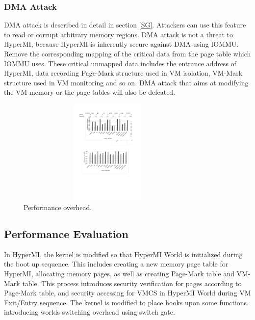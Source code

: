 \documentclass[conference]{IEEEtran}
\begin{document}
\subsubsection{DMA Attack}

 DMA attack is described in detail in section \ref{SG}. Attackers can use this feature to read or corrupt arbitrary memory regions. DMA attack is not a threat to HyperMI, because HyperMI is inherently secure against DMA using IOMMU. Remove the corresponding mapping of the critical data from the page table which IOMMU uses. These critical unmapped data includes the entrance address of HyperMI, data recording Page-Mark structure used in VM isolation, VM-Mark structure used in VM monitoring and so on. DMA attack that aims at modifying the VM memory or the page tables will also be defeated.

\begin{figure}
\centerline{\includegraphics[width=9cm,height=5.2cm]{performance.pdf}}
\caption{Performance overhead.} \label{fig5}
\end{figure}

\subsection{Performance Evaluation}

In HyperMI, the kernel is modified so that HyperMI World is initialized during the boot up sequence. This includes creating a new memory page table for HyperMI, allocating memory pages, as well as creating Page-Mark table and VM-Mark table. This process introduces security verification for pages according to Page-Mark table, and security accessing for VMCS in HyperMI World during VM Exit/Entry sequence.
The kernel is modified to place hooks upon some functions.
introducing worlds switching overhead using switch gate.
\end{document}
